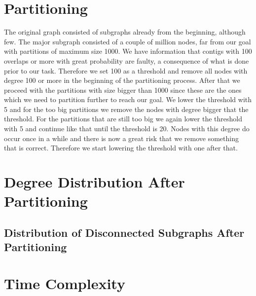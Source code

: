 \documentclass[a4paper,10pt]{article}
\begin{document}
\section{Partitioning}


The original graph consisted of subgraphs already from the beginning, although few. The major subgraph consisted of a couple of million
nodes, far from our goal with partitions of maximum size 1000. We have information that contigs with 100 overlaps or more with great
probability are faulty, a consequence of what is done prior to our task. Therefore we set 100 as a threshold and remove all nodes with
degree 100 or more in the beginning of the partitioning process. After that we proceed with the partitions with size bigger than 1000
since these are the ones which we need to partition further to reach our goal. We lower the threshold with 5 and for the too big
partitions we remove the nodes with degree bigger that the threshold. For the partitions that are still too big we again lower the
threshold with 5 and continue like that until the threshold is 20. Nodes with this degree do occur once in a while and there is now a
great risk that we remove something that is correct. Therefore we start lowering the threshold with one after that.



\section{Degree Distribution After Partitioning}


\subsection{Distribution of Disconnected Subgraphs After Partitioning}


\section{Time Complexity}
\end{document}
